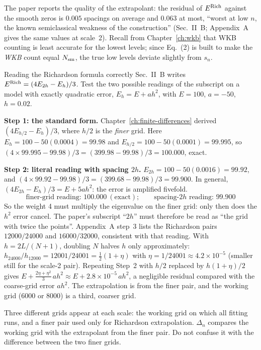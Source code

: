 The paper reports the quality of the extrapolant: the residual of $E^{\rm Rich}$ against the smooth zeros is $0.005$ spacings on average and $0.063$ at most, ``worst at low $n$, the known semiclassical weakness of the construction'' (Sec.~II~B; Appendix~A gives the same values at scale~2). Recall from Chapter~\ref{ch:wkb} that WKB counting is least accurate for the lowest levels; since Eq.~(2) is built to make the \emph{WKB} count equal $N_{\mathrm{sm}}$, the true low levels deviate slightly from $s_n$.

\begin{sample}{Reading the Richardson formula correctly}
Sec.~II~B writes $E^{\rm Rich}=(4E_{2h}-E_h)/3$. Test the two possible readings of the subscript on a model with exactly quadratic error, $E_h=E+ah^2$, with $E=100$, $a=-50$, $h=0.02$.

\textbf{Step 1: the standard form.} Chapter~\ref{ch:finite-differences} derived $(4E_{h/2}-E_h)/3$, where $h/2$ is the \emph{finer} grid. Here $E_h=100-50(0.0004)=99.98$ and $E_{h/2}=100-50(0.0001)=99.995$, so $(4\times99.995-99.98)/3=(399.98-99.98)/3=100.000$, exact.

\textbf{Step 2: literal reading with spacing $2h$.} $E_{2h}=100-50(0.0016)=99.92$, and $(4\times99.92-99.98)/3=(399.68-99.98)/3=99.900$. In general, $(4E_{2h}-E_h)/3=E+5ah^2$: the error is amplified fivefold.
\[
\boxed{\text{finer-grid reading: }100.000\ (\text{exact});\qquad \text{spacing-}2h\text{ reading: }99.900}
\]
So the weight 4 must multiply the eigenvalue on the finer grid: only then does the $h^2$ error cancel. The paper's subscript ``$2h$'' must therefore be read as ``the grid with twice the points''. Appendix~A step~3 lists the Richardson pairs $12000/24000$ and $16000/32000$, consistent with that reading. With $h=2L/(N+1)$, doubling $N$ halves $h$ only approximately: $h_{24000}/h_{12000}=12001/24001=\tfrac12(1+\eta)$ with $\eta=1/24001\approx4.2\times10^{-5}$ (smaller still for the scale-2 pair). Repeating Step~2 with $h/2$ replaced by $h(1+\eta)/2$ gives $E+\tfrac{2\eta+\eta^2}{3}\,ah^2\approx E+2.8\times10^{-5}\,ah^2$, a negligible residual compared with the coarse-grid error $ah^2$. The extrapolation is from the finer pair, and the working grid ($6000$ or $8000$) is a third, coarser grid.
\end{sample}

\begin{pitfall}
Three different grids appear at each scale: the working grid on which all fitting runs, and a finer pair used only for Richardson extrapolation. $\Delta_n$ compares the working grid with the extrapolant from the finer pair. Do not confuse it with the difference between the two finer grids.
\end{pitfall}

